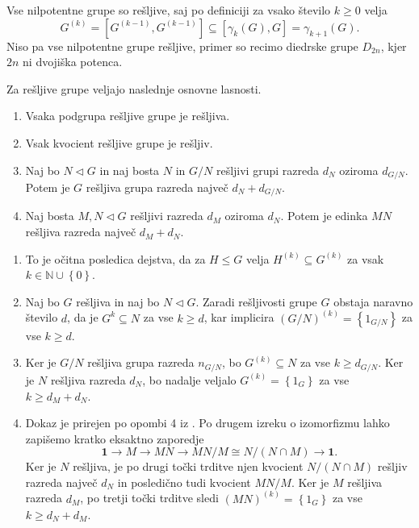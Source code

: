     \begin{primer}
        Vse nilpotentne grupe so rešljive, saj po definiciji za vsako število $k \ge 0$ velja \begin{equation*}
        G^{(k)} = [G^{(k-1)}, G^{(k-1)}] \subseteq  [\gamma_k(G), G] = \gamma_{k +1}(G).
        \end{equation*}
        Niso pa vse nilpotentne grupe rešljive, primer so recimo diedrske grupe $D_{2n}$, kjer $2n$ ni dvojiška potenca. 
    \end{primer}
    
    \begin{trditev}
    \label{trd_lastnosti_resljivih_grup}
    Za rešljive grupe veljajo naslednje osnovne lasnosti.
     \begin{enumerate}
        \item Vsaka podgrupa rešljive grupe je rešljiva.
        \item Vsak kvocient rešljive grupe je rešljiv.
        \item Naj bo $N \triangleleft G$ in naj bosta $N$ in $G / N$ rešljivi grupi razreda $d_{N}$ oziroma $d_{G / N}$. Potem je $G$ rešljiva grupa razreda največ $d_N + d_{G / N}$.
        \item Naj bosta $M, N \triangleleft G$ rešljivi razreda $d_M$ oziroma $d_N$. Potem je edinka $MN$ rešljiva razreda največ $d_M + d_N$.   
     \end{enumerate}
    \end{trditev}
    \begin{dokaz}
        \begin{enumerate}
            \item To je očitna posledica dejstva, da za $H \le G$ velja $H^{(k)} \subseteq G^{(k)}$ za vsak $k \in \mathbb{N} \cup \left\{ 0\right\}$.
            \item Naj bo $G$ rešljiva in naj bo $N \triangleleft G$. Zaradi rešljivosti grupe $G$ obstaja naravno število $d$, da je $G^{k} \subseteq N$ za vse $k \ge d$, kar implicira $ (G / N)^{(k)} = \left\{ 1_{G / N}\right\}$ za vse $k \ge d$. 
            \item Ker je $G / N$ rešljiva grupa razreda $n_{G / N}$, bo $G^{(k)} \subseteq N$ za vse $k \ge d_{G / N}$. Ker je $N$ rešljiva razreda $d_N$, bo nadalje veljalo $G^{(k)} = \left\{ 1_G\right\}$ za vse $k \ge d_M + d_N$.
            \item Dokaz je prirejen po opombi 4 iz \cite[str.4]{Schneider_2016}. Po drugem izreku o izomorfizmu lahko zapišemo kratko eksaktno zaporedje \begin{equation*}
            \mathbf{1} \to M \to MN \to MN / M \cong N / (N \cap M) \to \mathbf{1}.
            \end{equation*}  
            Ker je $N$ rešljiva, je po drugi točki trditve  njen kvocient $ N / (N \cap M)$ rešljiv razreda največ $d_N$ in posledično tudi kvocient $ MN / M $. Ker je $M$ rešljiva razreda $d_M$, po tretji točki trditve sledi $(MN)^{(k)} = \left\{ 1_{G}\right\}$ za vse $k \ge d_N + d_M$.
        \end{enumerate}
    \end{dokaz}

